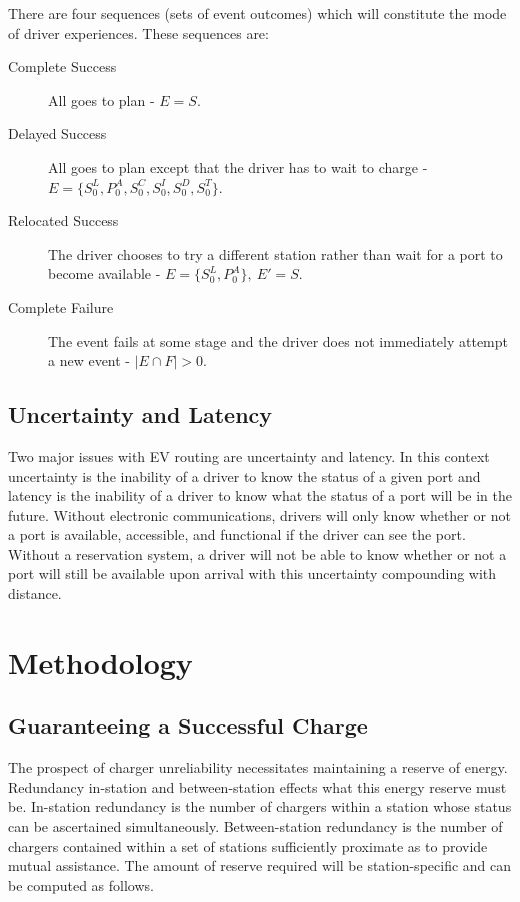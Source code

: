 \documentclass[11pt]{article}
\begin{document}
There are four sequences (sets of event outcomes) which will constitute the mode of driver experiences. These sequences are:

\begin{description}
	\item[Complete Success] All goes to plan - $E = S$.
	\item[Delayed Success] All goes to plan except that the driver has to wait to charge - $E = \{S^L_0, P^A_0, S^C_0, S^I_0, S^D_0, S^T_0\}$.
	\item[Relocated Success] The driver chooses to try a different station rather than wait for a port to become available - $E = \{S^L_0, P^A_0\},\ E' = S$.
	\item[Complete Failure] The event fails at some stage and the driver does not immediately attempt a new event - $|E\cap F| > 0$. 
\end{description}

\subsection*{Uncertainty and Latency}

Two major issues with EV routing are uncertainty and latency. In this context uncertainty is the inability of a driver to know the status of a given port and latency is the inability of a driver to know what the status of a port will be in the future. Without electronic communications, drivers will only know whether or not a port is available, accessible, and functional if the driver can see the port. Without a reservation system, a driver will not be able to know whether or not a port will still be available upon arrival with this uncertainty compounding with distance.

\section*{Methodology}

\subsection*{Guaranteeing a Successful Charge}

The prospect of charger unreliability necessitates maintaining a reserve of energy. Redundancy in-station and between-station effects what this energy reserve must be. In-station redundancy is the number of chargers within a station whose status can be ascertained simultaneously. Between-station redundancy is the number of chargers contained within a set of stations sufficiently proximate as to provide mutual assistance. The amount of reserve required will be station-specific and can be computed as follows.
\end{document}
